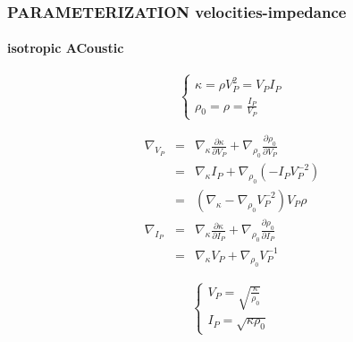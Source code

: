 \documentclass[9pt]{beamer}
\newcommand{\partderi}[2]{\frac{\partial#1}{\partial#2}}
\begin{document}
\begin{frame}\frametitle{PARAMETERIZATION velocities-impedance}
\framesubtitle{isotropic ACoustic}

  \begin{center}
  \end{center}
  
  \begin{minipage}{0.45\linewidth}
    \[\left\{ \begin{array}{l}
      \kappa = \rho V_P^2 = V_PI_P \\
      \rho_0 = \rho = \frac{I_P}{V_P}
    \end{array} \right.\]
    
    \begin{eqnarray}
      \nabla_{V_P} &=& \nabla_{\kappa} \partderi{\kappa}{V_P} + \nabla_{\rho_0} \partderi{\rho_0}{V_P} \nonumber\\
                   &=& \nabla_{\kappa} I_P + \nabla_{\rho_0} (-I_PV_P^{-2}) \nonumber\\
                   &=& \left( \nabla_{\kappa} - \nabla_{\rho_0}V_P^{-2} \right)V_P\rho \nonumber\\
      \nabla_{I_P} &=& \nabla_{\kappa} \partderi{\kappa}{I_P} + \nabla_{\rho_0} \partderi{\rho_0}{I_P} \nonumber\\
		   &=& \nabla_{\kappa} V_P + \nabla_{\rho_0} V_P^{-1} \nonumber
    \end{eqnarray}

  \end{minipage} \vline
  \begin{minipage}{0.45\linewidth}
    \[\left\{ \begin{array}{l}
      V_P  = \sqrt{\frac{\kappa}{\rho_0}} \\
      I_P = \sqrt{\kappa\rho_0}
    \end{array} \right.\]
    

\end{minipage}
\end{frame}
\end{document}
